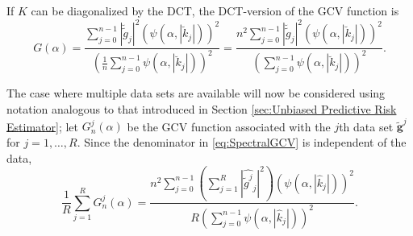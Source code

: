 \documentclass[12pt,notitlepage]{report}
\newcommand{\gnoise}{\widetilde{g}}	%
\newcommand{\gnoiseVec}{\widetilde{\mathbf{g}}}	%
\newcommand{\kMat}{K}	%
\newcommand{\dct}[1]{\breve{#1}}	%
\newcommand{\regparam}{\alpha}
\newcommand{\mfilt}{\psi}
\newcommand{\GCV}{G}	%
\begin{document}
If $\kMat$ can be diagonalized by the DCT, the DCT-version of the GCV function is
\begin{equation}
\GCV(\regparam) = \frac{\sum_{j = 0}^{n-1} |\dct{\gnoise}_j|^2(\mfilt(\regparam,|\dct{k}_j|))^2}{(\frac{1}{n}\sum_{j = 0}^{n-1} \mfilt(\regparam,|\dct{k}_j|))^2} = \frac{n^2\sum_{j = 0}^{n-1} |\dct{\gnoise}_j|^2(\mfilt(\regparam,|\dct{k}_j|))^2}{(\sum_{j = 0}^{n-1} \mfilt(\regparam,|\dct{k}_j|))^2}.
\label{eq:GCV DCT}
\end{equation}

The case where multiple data sets are available will now be considered using notation analogous to that introduced in Section \ref{sec:Unbiased Predictive Risk Estimator}; let $\GCV_n^j(\regparam)$ be the GCV function associated with the $j$th data set $\gnoiseVec^j$ for $j = 1,\ldots,R$. Since the denominator in \eqref{eq:SpectralGCV} is independent of the data,
\begin{equation}
\frac{1}{R}\sum_{j=1}^R \GCV_n^j(\regparam)  = \frac{n^2\sum_{j = 0}^{n-1} \left(\sum_{j=1}^R |\widehat{\gnoise^j}_j|^2\right)(\mfilt(\regparam,|\widehat{k}_j|))^2}{R(\sum_{j = 0}^{n-1} \mfilt(\regparam,|\widehat{k}_j|))^2}.
\label{eq:SpectralGCVsum}
\end{equation}
\end{document}
